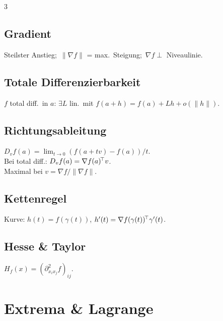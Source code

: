 \documentclass[8pt,a4paper]{extarticle}
\begin{document}
\begin{multicols*}{3}
\subsection{Gradient}
Steilster Anstieg;\ $\|\nabla f\|$ = max.\ Steigung;\ $\nabla f\perp$ Niveaulinie.

\subsection{Totale Differenzierbarkeit}
$f$ total diff.\ in $a$: $\exists L$ lin.\ mit $f(a{+}h)=f(a)+Lh+o(\|h\|)$.

\subsection{Richtungsableitung}
$D_v f(a)=\lim_{t\to 0}(f(a{+}tv){-}f(a))/t$.\\
Bei total diff.: $D_v f(a)=\nabla f(a)^{\!\top} v$.\\
Maximal bei $v=\nabla f/\|\nabla f\|$.

\subsection{Kettenregel}
Kurve: $h(t)=f(\gamma(t))$, $h'(t)=\nabla f(\gamma(t))^{\!\top} \gamma'(t)$.

\subsection{Hesse \& Taylor}
$H_f(x)=(\partial^2_{x_i x_j}f)_{ij}$.

\section{Extrema \& Lagrange}

\end{multicols*}
\end{document}
